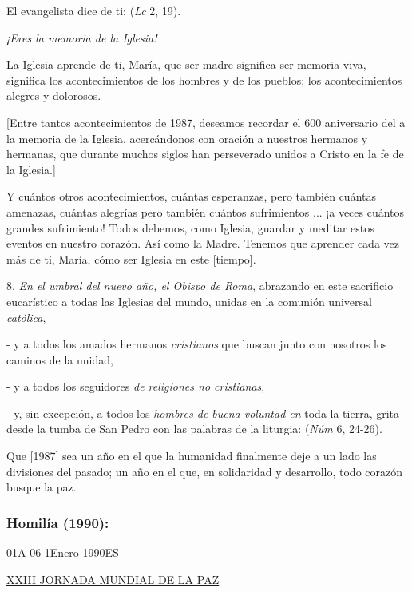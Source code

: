 \begin{body}
	El evangelista dice de ti:  (\emph{Lc} 2, 19).
	
	\emph{¡Eres la memoria de la Iglesia!}
	
	La Iglesia aprende de ti, María, que ser madre significa ser memoria viva, significa  los acontecimientos de los hombres y de los pueblos; los acontecimientos alegres y dolorosos.
	
	{[}Entre tantos acontecimientos de 1987, deseamos recordar el 600 aniversario del  a la memoria de la Iglesia, acercándonos con oración a nuestros hermanos y hermanas, que durante muchos siglos han perseverado unidos a Cristo en la fe de la Iglesia.{]}
	
	Y cuántos otros acontecimientos, cuántas esperanzas, pero también cuántas amenazas, cuántas alegrías pero también cuántos sufrimientos ... ¡a veces cuántos grandes sufrimiento! Todos debemos, como Iglesia, guardar y meditar estos eventos en nuestro corazón. Así como la Madre. Tenemos que aprender cada vez más de ti, María, cómo ser Iglesia en este {[}tiempo{]}.
	
	8. \emph{En el umbral del nuevo año, el Obispo de Roma}, abrazando en este sacrificio eucarístico a todas las Iglesias del mundo, unidas en la comunión universal \emph{católica},
	
	- y a todos los amados hermanos \emph{cristianos} que buscan junto con nosotros los caminos de la unidad,
	
	- y a todos los seguidores \emph{de religiones no cristianas},
	
	- y, sin excepción, a todos los \emph{hombres de buena voluntad en} toda la tierra, grita desde la tumba de San Pedro con las palabras de la liturgia:  (\emph{Núm} 6, 24-26).
	
	Que {[}1987{]} sea un año en el que la humanidad finalmente deje a un lado las divisiones del pasado; un año en el que, en solidaridad y desarrollo, todo corazón busque la paz.
	
	\subsubsection{Homilía (1990): } 01A-06-1Enero-1990ES
	
	\href{http://www.vatican.va/gmg/years/gmg_1990_it.html}{XXIII JORNADA 	MUNDIAL DE LA PAZ}
	

\end{body}

